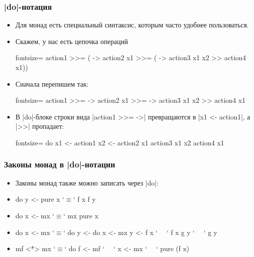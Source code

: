 \documentclass[11pt]{beamer}
\begin{document}
\begin{frame}[fragile]
  \frametitle{\haskinline|do|-нотация}
  \begin{itemize}
    \item Для монад есть специальный синтаксис, которым часто удобнее пользоваться.
    \item Скажем, у нас есть цепочка операций
          \begin{haskell*}{fontsize=\footnotesize}
            action1 >>= ( -> action2 x1 >>=
            ( -> action3 x1 x2 >> action4 x1))
          \end{haskell*}
    \item
          Сначала перепишем так:
          \begin{haskell*}{fontsize=\footnotesize}
            action1 >>=  ->
            action2 x1 >>=  ->
            action3 x1 x2 >>
            action4 x1
          \end{haskell*}
    \item
          В \haskinline|do|-блоке строки вида \haskinline|action1 >>=  ->| превращаются в \haskinline|x1 <- action1|, а \haskinline|>>| пропадает:
          \begin{haskell*}{fontsize=\footnotesize}
            do x1 <- action1
            x2 <- action2 x1
            action3 x1 x2
            action4 x1
          \end{haskell*}
  \end{itemize}
\end{frame}

\begin{frame}[fragile]
  \frametitle{Законы монад в \haskinline|do|-нотации}
  \begin{itemize}[<+->]
    \item Законы монад также можно записать через \haskinline|do|:
    \item
          \begin{haskell}
    do y <- pure x    `$\mathtt{\equiv}$`    f x
       f y
    \end{haskell}
    \item
          \begin{haskell}
    do x <- mx        `$\mathtt{\equiv}$`    mx
       pure x
    \end{haskell}
    \item
          \begin{haskell}
    do x <- mx        `$\mathtt{\equiv}$`    do y <- do x <- mx
       y <- f x       `\textcolor{white}{$\mathtt{\equiv}$}`               f x
       g y            `\textcolor{white}{$\mathtt{\equiv}$}`       g y
    \end{haskell}
    \item
          \begin{haskell}
    mf <*> mx         `$\mathtt{\equiv}$`    do f <- mf
                      `\textcolor{white}{$\mathtt{\equiv}$}`       x <- mx
                      `\textcolor{white}{$\mathtt{\equiv}$}`       pure (f x)
    \end{haskell}
  \end{itemize}
\end{frame}
\end{document}
